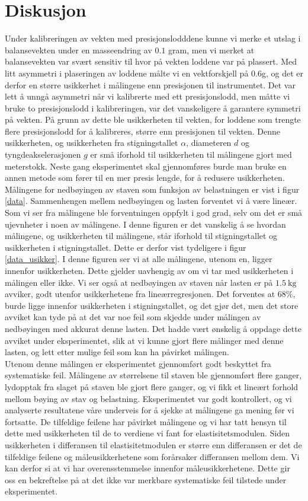 \documentclass[%
 reprint,
 amsmath,amssymb,
 aps,
 norsk,
 booktabs
]{revtex4-1}
\begin{document}
\section{Diskusjon}
Under kalibreringen av vekten med presisjonslodddene kunne vi merke et utslag i balansevekten under en masseendring av $0.1$ gram, men vi merket at balansevekten var svært sensitiv til hvor på vekten loddene var på plassert. Med litt asymmetri i plaseringen av loddene målte vi en vektforskjell på $0.6$g, og det er derfor en større usikkerhet i målingene enn presisjonen til instrumentet. Det var lett å unngå asymmetri når vi kalibrerte med ett presisjonslodd, men måtte vi bruke to presisjonslodd i kalibreringen, var det vanskeligere å garantere symmetri på vekten. På grunn av dette ble usikkerheten til vekten, for loddene som trengte flere presisjonslodd for å kalibreres, større enn presisjonen til vekten. Denne usikkerheten, og usikkerheten fra stigningstallet $\alpha$, diameteren $d$ og tyngdeakselerasjonen $g$ er små iforhold til usikkerheten til målingene gjort med meterstokk. Neste gang eksperimentet skal gjennomføres burde man bruke en annen metode som fører til en mer presis lengde, for å redusere usikkerheten.\\
Målingene for nedbøyingen av staven som funksjon av belastningen er vist i figur \vref{data}. Sammenhengen mellem nedbøyingen og lasten forventet vi å være lineær. Som vi ser fra målingene ble forventningen oppfylt i god grad, selv om det er små ujevnheter i noen av målingene. I denne figuren er det vanskelig å se hvordan målingene, og usikkerheten til målingene, står iforhold til stigningstallet og usikkerheten i stigningstallet. Dette er derfor vist tydeligere i figur \vref{data_usikker}. I denne figuren ser vi at alle målingene, utenom en, ligger innenfor usikkerheten. Dette gjelder uavhengig av om vi tar med usikkerheten i målingen eller ikke. Vi ser også at nedbøyingen av staven når lasten er på $\SI{1.5}{\kilo\gram}$ avviker, godt utenfor usikkerhetene fra lineærregresjonen. Det forventes at $68\%$, burde ligge innenfor usikkerheten i stigningstallet, og det gjør det, men det store avviket kan tyde på at det var noe feil som skjedde under målingen av nedbøyingen med akkurat denne lasten. Det hadde vært ønskelig å oppdage dette avviket under eksperimentet, slik at vi kunne gjort flere målinger med denne lasten, og lett etter mulige feil som kan ha påvirket målingen.\\
Utenom denne målingen er eksperimentet gjennomført godt beskyttet fra systematiske feil. Målingene av størrelsene til staven ble gjennomført flere ganger, lydopptak fra slaget på staven ble gjort flere ganger, og vi fikk et lineært forhold mellom bøying av stav og belastning. Eksperimentet var godt kontrollert, og vi analyserte resultatene våre underveis for å sjekke at målingene ga mening før vi fortsatte. De tilfeldige feilene har påvirket målingene og vi har tatt hensyn til dette med usikkerheten til de to verdiene vi fant for elastisitetsmodulen. Siden usikkerheten i differansen til elastisitetmodulen er større enn differansen er det de tilfeldige feilene og måleusikkerhetene som forårsaker differansen mellom dem. Vi kan derfor si at vi har overensstemmelse innenfor måleusikkerhetene. Dette gir oss en bekreftelse på at det ikke var merkbare systematiske feil tilstede under eksperimentet.
\end{document}
